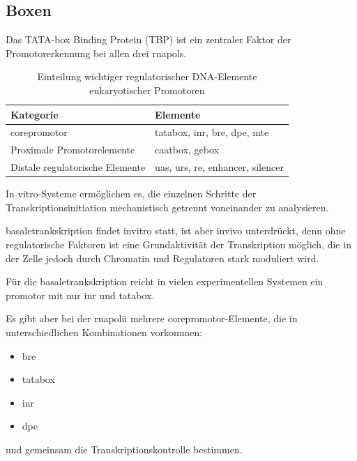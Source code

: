 
\subsection{Boxen}\label{subsec:boxen}
Das TATA-box Binding Protein (TBP) ist ein zentraler Faktor der Promotorerkennung bei allen drei \glspl{rnapol}.

\begin{table}[h]
    \centering
    \begin{tabular}{|l|p{9cm}|}
        \hline
        \textbf{Kategorie} & \textbf{Elemente} \\
        \hline
        \gls{corepromotor} &
        \gls{tatabox}, \gls{inr}, \gls{bre}, \gls{dpe}, \gls{mte} \\
        \hline
        Proximale Promotorelemente &
        \gls{caatbox}, \gls{gcbox} \\
        \hline
        Distale regulatorische Elemente &
        \gls{uas}, \gls{urs}, \gls{re}, \gls{enhancer}, \gls{silencer} \\
        \hline
    \end{tabular}
    \caption{Einteilung wichtiger regulatorischer DNA-Elemente eukaryotischer Promotoren}
    \label{tab:promotorelemente}
\end{table}

In vitro-Systeme ermöglichen es, die einzelnen Schritte der Transkriptionsinitiation mechanistisch getrennt voneinander zu analysieren.

\gls{basaletrankskription} findet \gls{invitro} statt, ist aber \gls{invivo} unterdrückt, denn
ohne regulatorische Faktoren ist eine Grundaktivität der Transkription möglich, die in der Zelle jedoch durch
Chromatin und Regulatoren stark moduliert wird.

Für die \gls{basaletrankskription} reicht in vielen experimentellen Systemen ein \gls{promotor} mit nur \gls{inr} und
\gls{tatabox}.

Es gibt aber bei der \gls{rnapolii} mehrere \gls{corepromotor}-Elemente, die in unterschiedlichen Kombinationen vorkommen:
\begin{itemize}
    \item \gls{bre}
    \item \gls{tatabox}
    \item \gls{inr}
    \item \gls{dpe}
\end{itemize}
und gemeinsam die Transkriptionskontrolle bestimmen.

